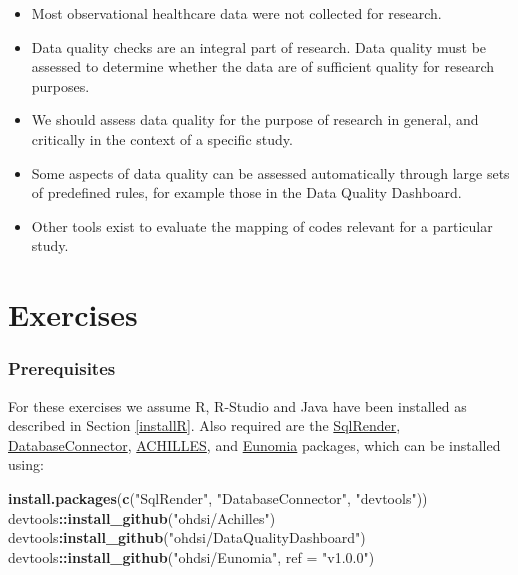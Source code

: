 \documentclass[11pt]{book}
\newenvironment{Shaded}{\begin{snugshade}}{\end{snugshade}}
\newcommand{\KeywordTok}[1]{\textcolor[rgb]{0.13,0.29,0.53}{\textbf{#1}}}
\newcommand{\DataTypeTok}[1]{\textcolor[rgb]{0.13,0.29,0.53}{#1}}
\newcommand{\StringTok}[1]{\textcolor[rgb]{0.31,0.60,0.02}{#1}}
\newcommand{\OperatorTok}[1]{\textcolor[rgb]{0.81,0.36,0.00}{\textbf{#1}}}
\newcommand{\NormalTok}[1]{#1}
\theoremstyle{definition}
\theoremstyle{definition}
\theoremstyle{definition}
\theoremstyle{remark}
\let\BeginKnitrBlock\begin \let\EndKnitrBlock\end
\begin{document}
\BeginKnitrBlock{rmdsummary}
\begin{itemize}
\item
  Most observational healthcare data were not collected for research.
\item
  Data quality checks are an integral part of research. Data quality
  must be assessed to determine whether the data are of sufficient
  quality for research purposes.
\item
  We should assess data quality for the purpose of research in general,
  and critically in the context of a specific study.
\item
  Some aspects of data quality can be assessed automatically through
  large sets of predefined rules, for example those in the Data Quality
  Dashboard.
\item
  Other tools exist to evaluate the mapping of codes relevant for a
  particular study.
\end{itemize}
\EndKnitrBlock{rmdsummary}

\section{Exercises}\label{exercises-6}

\subsubsection*{Prerequisites}\label{prerequisites-6}

For these exercises we assume R, R-Studio and Java have been installed
as described in Section \ref{installR}. Also required are the
\href{https://ohdsi.github.io/SqlRender/}{SqlRender},
\href{https://ohdsi.github.io/DatabaseConnector/}{DatabaseConnector},
\href{https://github.com/OHDSI/Achilles}{ACHILLES}, and
\href{https://ohdsi.github.io/Eunomia/}{Eunomia} packages, which can be
installed using:

\begin{Shaded}
\begin{Highlighting}[]
\KeywordTok{install.packages}\NormalTok{(}\KeywordTok{c}\NormalTok{(}\StringTok{"SqlRender"}\NormalTok{, }\StringTok{"DatabaseConnector"}\NormalTok{, }\StringTok{"devtools"}\NormalTok{))}
\NormalTok{devtools}\OperatorTok{::}\KeywordTok{install_github}\NormalTok{(}\StringTok{"ohdsi/Achilles"}\NormalTok{)}
\NormalTok{devtools}\OperatorTok{:}\KeywordTok{install_github}\NormalTok{(}\StringTok{"ohdsi/DataQualityDashboard"}\NormalTok{)}
\NormalTok{devtools}\OperatorTok{::}\KeywordTok{install_github}\NormalTok{(}\StringTok{"ohdsi/Eunomia"}\NormalTok{, }\DataTypeTok{ref =} \StringTok{"v1.0.0"}\NormalTok{)}
\end{Highlighting}
\end{Shaded}
\end{document}
